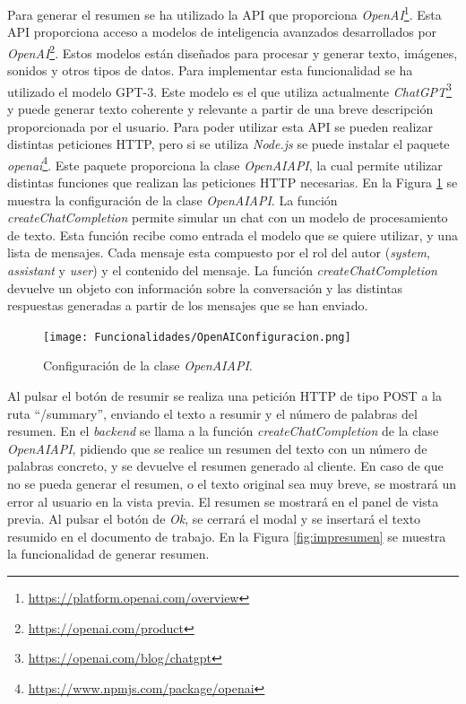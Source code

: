 Para generar el resumen se ha utilizado la API que proporciona \textit{OpenAI}\footnote{\url{https://platform.openai.com/overview}}. Esta API proporciona acceso a modelos de inteligencia avanzados desarrollados por \textit{OpenAI}\footnote{\url{https://openai.com/product}}. Estos modelos están diseñados para procesar y generar texto, imágenes, sonidos y otros tipos de datos. Para implementar esta funcionalidad se ha utilizado el modelo GPT-3. Este modelo es el que utiliza actualmente \textit{ChatGPT}\footnote{\url{https://openai.com/blog/chatgpt}} y puede generar texto coherente y relevante a partir de una breve descripción proporcionada por el usuario. Para poder utilizar esta API se pueden realizar distintas peticiones HTTP, pero si se utiliza \textit{Node.js} se puede instalar el paquete \textit{openai}\footnote{\url{https://www.npmjs.com/package/openai}}. Este paquete proporciona la clase \textit{OpenAIAPI}, la cual permite utilizar distintas funciones que realizan las peticiones HTTP necesarias. En la Figura \ref{fig:impresumenconfiguracion} se muestra la configuración de la clase \textit{OpenAIAPI}. La función \textit{createChatCompletion} permite simular un chat con un modelo de procesamiento de texto. Esta función recibe como entrada el modelo que se quiere utilizar, y una lista de mensajes. Cada mensaje esta compuesto por el rol del autor (\textit{system}, \textit{assistant} y \textit{user}) y el contenido del mensaje. La función \textit{createChatCompletion} devuelve un objeto con información sobre la conversación y las distintas respuestas generadas a partir de los mensajes que se han enviado.
\begin{figure}[ht!]
  \centering
  \texttt{[image: Funcionalidades/OpenAIConfiguracion.png]}
  \caption{Configuración de la clase \textit{OpenAIAPI}.}
  \label{fig:impresumenconfiguracion}
\end{figure}

Al pulsar el botón de resumir se realiza una petición HTTP de tipo POST a la ruta ``/summary'', enviando el texto a resumir y el número de palabras del resumen. En el \textit{backend} se llama a la función \textit{createChatCompletion} de la clase \textit{OpenAIAPI}, pidiendo que se realice un resumen del texto con un número de palabras concreto, y se devuelve el resumen generado al cliente. En caso de que no se pueda generar el resumen, o el texto original sea muy breve, se mostrará un error al usuario en la vista previa. El resumen se mostrará en el panel de vista previa. Al pulsar el botón de \textit{Ok}, se cerrará el modal y se insertará el texto resumido en el documento de trabajo. En la Figura \ref{fig:impresumen} se muestra la funcionalidad de generar resumen.


